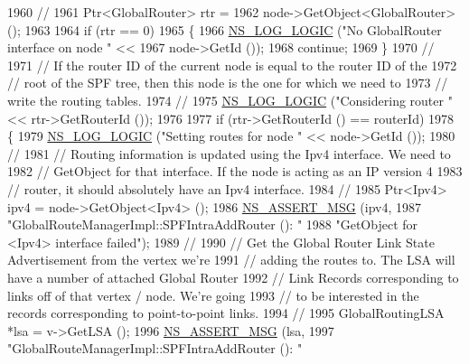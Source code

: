 \begin{DoxyCode}
1960 \textcolor{comment}{// }
1961       Ptr<GlobalRouter> rtr = 
1962         node->GetObject<GlobalRouter> ();
1963 
1964       \textcolor{keywordflow}{if} (rtr == 0)
1965         \{
1966           \hyperlink{group__logging_ga88acd260151caf2db9c0fc84997f45ce}{NS\_LOG\_LOGIC} (\textcolor{stringliteral}{"No GlobalRouter interface on node "} << 
1967                         node->GetId ());
1968           \textcolor{keywordflow}{continue};
1969         \}
1970 \textcolor{comment}{//}
1971 \textcolor{comment}{// If the router ID of the current node is equal to the router ID of the }
1972 \textcolor{comment}{// root of the SPF tree, then this node is the one for which we need to }
1973 \textcolor{comment}{// write the routing tables.}
1974 \textcolor{comment}{//}
1975       \hyperlink{group__logging_ga88acd260151caf2db9c0fc84997f45ce}{NS\_LOG\_LOGIC} (\textcolor{stringliteral}{"Considering router "} << rtr->GetRouterId ());
1976 
1977       \textcolor{keywordflow}{if} (rtr->GetRouterId () == routerId)
1978         \{
1979           \hyperlink{group__logging_ga88acd260151caf2db9c0fc84997f45ce}{NS\_LOG\_LOGIC} (\textcolor{stringliteral}{"Setting routes for node "} << node->GetId ());
1980 \textcolor{comment}{//}
1981 \textcolor{comment}{// Routing information is updated using the Ipv4 interface.  We need to }
1982 \textcolor{comment}{// GetObject for that interface.  If the node is acting as an IP version 4 }
1983 \textcolor{comment}{// router, it should absolutely have an Ipv4 interface.}
1984 \textcolor{comment}{//}
1985           Ptr<Ipv4> ipv4 = node->GetObject<Ipv4> ();
1986           \hyperlink{assert_8h_aff5ece9066c74e681e74999856f08539}{NS\_ASSERT\_MSG} (ipv4, 
1987                          \textcolor{stringliteral}{"GlobalRouteManagerImpl::SPFIntraAddRouter (): "}
1988                          \textcolor{stringliteral}{"GetObject for <Ipv4> interface failed"});
1989 \textcolor{comment}{//}
1990 \textcolor{comment}{// Get the Global Router Link State Advertisement from the vertex we're}
1991 \textcolor{comment}{// adding the routes to.  The LSA will have a number of attached Global Router}
1992 \textcolor{comment}{// Link Records corresponding to links off of that vertex / node.  We're going}
1993 \textcolor{comment}{// to be interested in the records corresponding to point-to-point links.}
1994 \textcolor{comment}{//}
1995           GlobalRoutingLSA *lsa = v->GetLSA ();
1996           \hyperlink{assert_8h_aff5ece9066c74e681e74999856f08539}{NS\_ASSERT\_MSG} (lsa, 
1997                          \textcolor{stringliteral}{"GlobalRouteManagerImpl::SPFIntraAddRouter (): "}

\end{DoxyCode}
